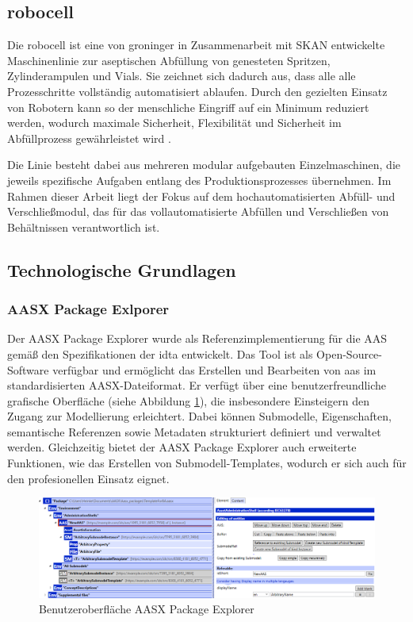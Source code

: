 %

\subsection{robocell}
Die robocell ist eine von groninger in Zusammenarbeit mit SKAN entwickelte Maschinenlinie zur aseptischen Abfüllung von genesteten Spritzen, Zylinderampulen und Vials.
Sie zeichnet sich dadurch aus, dass alle alle Prozesschritte vollständig automatisiert ablaufen.
Durch den gezielten Einsatz von Robotern kann so der menschliche Eingriff auf ein Minimum reduziert werden, wodurch maximale Sicherheit, Flexibilität und Sicherheit im Abfüllprozess gewährleistet wird \cite{RobocellWebsite}.

Die Linie besteht dabei aus mehreren modular aufgebauten Einzelmaschinen, die jeweils spezifische Aufgaben entlang des Produktionsprozesses übernehmen. 
Im Rahmen dieser Arbeit liegt der Fokus auf dem hochautomatisierten Abfüll- und Verschließmodul, das für das vollautomatisierte Abfüllen und Verschließen von Behältnissen verantwortlich ist.



\newpage
\subsection{Technologische Grundlagen}
\subsubsection{AASX Package Exlporer}
Der AASX Package Explorer wurde als Referenzimplementierung für die AAS gemäß den Spezifikationen der \acs{idta} entwickelt.
Das Tool ist als Open-Source-Software \cite{AASXPackageExplorer} verfügbar und ermöglicht das Erstellen und Bearbeiten von \acs{aas} im standardisierten AASX-Dateiformat.
Er verfügt über eine benutzerfreundliche grafische Oberfläche (siehe Abbildung \ref{fig:AASXPackageExplorer}), die insbesondere Einsteigern den Zugang zur Modellierung erleichtert.
Dabei können Submodelle, Eigenschaften, semantische Referenzen sowie Metadaten strukturiert definiert und verwaltet werden.
Gleichzeitig bietet der AASX Package Explorer auch erweiterte Funktionen, wie das Erstellen von Submodell-Templates, wodurch er sich auch für den profesionellen Einsatz eignet.

\begin{figure}[htbp]
    \centering
    \includegraphics[width=1\textwidth]{Bilder/AAS_PE.PNG}
    \caption{Benutzeroberfläche AASX Package Explorer}
    \label{fig:AASXPackageExplorer}
\end{figure}

